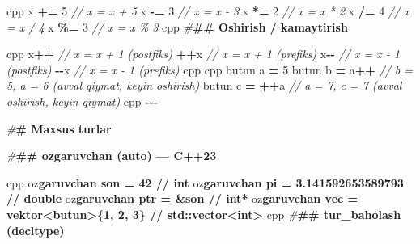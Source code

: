 \documentclass[a4paper,11pt,twoside,openright]{book}
\newenvironment{Shaded}{\begin{snugshade}}{\end{snugshade}}
\newcommand{\CharTok}[1]{\textcolor[rgb]{0.31,0.60,0.02}{#1}}
\newcommand{\CommentTok}[1]{\textcolor[rgb]{0.56,0.35,0.01}{\textit{#1}}}
\newcommand{\DecValTok}[1]{\textcolor[rgb]{0.00,0.00,0.81}{#1}}
\newcommand{\ErrorTok}[1]{\textcolor[rgb]{0.64,0.00,0.00}{\textbf{#1}}}
\newcommand{\NormalTok}[1]{#1}
\newcommand{\OperatorTok}[1]{\textcolor[rgb]{0.81,0.36,0.00}{\textbf{#1}}}
\newcommand{\PreprocessorTok}[1]{\textcolor[rgb]{0.56,0.35,0.01}{\textit{#1}}}
\begin{document}
\begin{Shaded}
\begin{Highlighting}[]
\ErrorTok{\textasciigrave{}\textasciigrave{}\textasciigrave{}}\NormalTok{cpp}
\NormalTok{x }\OperatorTok{+=} \DecValTok{5}    \CommentTok{// x = x + 5}
\NormalTok{x }\OperatorTok{{-}=} \DecValTok{3}    \CommentTok{// x = x {-} 3}
\NormalTok{x }\OperatorTok{*=} \DecValTok{2}    \CommentTok{// x = x * 2}
\NormalTok{x }\OperatorTok{/=} \DecValTok{4}    \CommentTok{// x = x / 4}
\NormalTok{x }\OperatorTok{\%=} \DecValTok{3}    \CommentTok{// x = x \% 3}
\ErrorTok{\textasciigrave{}\textasciigrave{}\textasciigrave{}}\NormalTok{cpp}
\PreprocessorTok{\#}\ErrorTok{\#\# Oshirish / kamaytirish}

\ErrorTok{\textasciigrave{}\textasciigrave{}\textasciigrave{}}\NormalTok{cpp}
\NormalTok{x}\OperatorTok{++}       \CommentTok{// x = x + 1 (postfiks)}
\OperatorTok{++}\NormalTok{x       }\CommentTok{// x = x + 1 (prefiks)}
\NormalTok{x}\OperatorTok{{-}{-}}       \CommentTok{// x = x {-} 1 (postfiks)}
\OperatorTok{{-}{-}}\NormalTok{x       }\CommentTok{// x = x {-} 1 (prefiks)}
\ErrorTok{\textasciigrave{}\textasciigrave{}\textasciigrave{}}\NormalTok{cpp}
\ErrorTok{\textasciigrave{}\textasciigrave{}\textasciigrave{}}\NormalTok{cpp}
\NormalTok{butun a }\OperatorTok{=} \DecValTok{5}
\NormalTok{butun b }\OperatorTok{=}\NormalTok{ a}\OperatorTok{++}     \CommentTok{// b = 5, a = 6 (avval qiymat, keyin oshirish)}
\NormalTok{butun c }\OperatorTok{=} \OperatorTok{++}\NormalTok{a     }\CommentTok{// a = 7, c = 7 (avval oshirish, keyin qiymat)}
\ErrorTok{\textasciigrave{}\textasciigrave{}\textasciigrave{}}\NormalTok{cpp}
\OperatorTok{{-}{-}{-}}

\PreprocessorTok{\#}\ErrorTok{\# Maxsus turlar}

\PreprocessorTok{\#}\ErrorTok{\#\# \textasciigrave{}o\textquotesingle{}zgaruvchan\textasciigrave{} (auto) — C++23}

\ErrorTok{\textasciigrave{}\textasciigrave{}\textasciigrave{}}\NormalTok{cpp}
\NormalTok{o}\CharTok{\textquotesingle{}z}\ErrorTok{garuvchan son = 42                        // int}
\NormalTok{o}\CharTok{\textquotesingle{}z}\ErrorTok{garuvchan pi = 3.141592653589793          // double}
\NormalTok{o}\CharTok{\textquotesingle{}z}\ErrorTok{garuvchan ptr = \&son                      // int*}
\NormalTok{o}\CharTok{\textquotesingle{}z}\ErrorTok{garuvchan vec = vektor\textless{}butun\textgreater{}\{1, 2, 3\}    // std::vector\textless{}int\textgreater{}}
\ErrorTok{\textasciigrave{}\textasciigrave{}\textasciigrave{}}\NormalTok{cpp}
\PreprocessorTok{\#}\ErrorTok{\#\# \textasciigrave{}tur\_baholash\textasciigrave{} (decltype)}


\end{Highlighting}
\end{Shaded}
\end{document}
